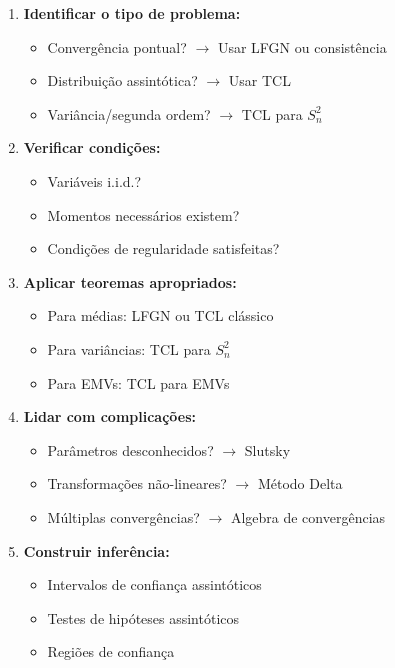 \documentclass[12pt,a4paper]{article}
\theoremstyle{definition}
\theoremstyle{plain}
\begin{document}
\begin{enumerate}
    \item \textbf{Identificar o tipo de problema:}
    \begin{itemize}
        \item Convergência pontual? $\to$ Usar LFGN ou consistência
        \item Distribuição assintótica? $\to$ Usar TCL
        \item Variância/segunda ordem? $\to$ TCL para $S_n^2$
    \end{itemize}
    
    \item \textbf{Verificar condições:}
    \begin{itemize}
        \item Variáveis i.i.d.?
        \item Momentos necessários existem?
        \item Condições de regularidade satisfeitas?
    \end{itemize}
    
    \item \textbf{Aplicar teoremas apropriados:}
    \begin{itemize}
        \item Para médias: LFGN ou TCL clássico
        \item Para variâncias: TCL para $S_n^2$
        \item Para EMVs: TCL para EMVs
    \end{itemize}
    
    \item \textbf{Lidar com complicações:}
    \begin{itemize}
        \item Parâmetros desconhecidos? $\to$ Slutsky
        \item Transformações não-lineares? $\to$ Método Delta
        \item Múltiplas convergências? $\to$ Algebra de convergências
    \end{itemize}
    
    \item \textbf{Construir inferência:}
    \begin{itemize}
        \item Intervalos de confiança assintóticos
        \item Testes de hipóteses assintóticos
        \item Regiões de confiança
    \end{itemize}
\end{enumerate}
\end{document}
